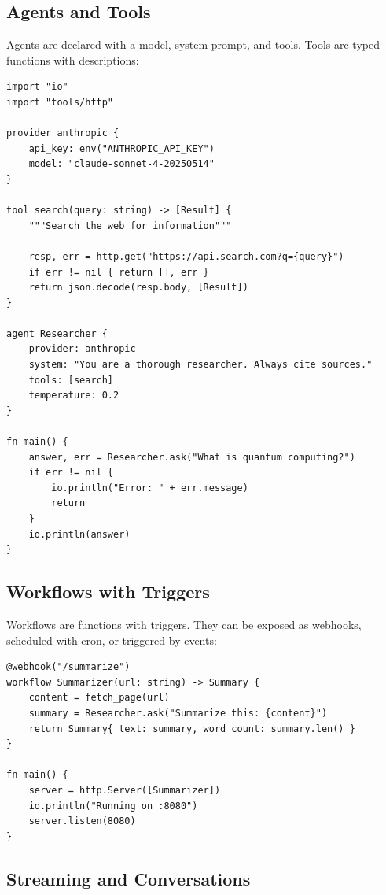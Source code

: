 \subsection{Agents and Tools}

Agents are declared with a model, system prompt, and tools. Tools are typed functions with descriptions:

\begin{lstlisting}
import "io"
import "tools/http"

provider anthropic {
    api_key: env("ANTHROPIC_API_KEY")
    model: "claude-sonnet-4-20250514"
}

tool search(query: string) -> [Result] {
    """Search the web for information"""

    resp, err = http.get("https://api.search.com?q={query}")
    if err != nil { return [], err }
    return json.decode(resp.body, [Result])
}

agent Researcher {
    provider: anthropic
    system: "You are a thorough researcher. Always cite sources."
    tools: [search]
    temperature: 0.2
}

fn main() {
    answer, err = Researcher.ask("What is quantum computing?")
    if err != nil {
        io.println("Error: " + err.message)
        return
    }
    io.println(answer)
}
\end{lstlisting}

\subsection{Workflows with Triggers}

Workflows are functions with triggers. They can be exposed as webhooks, scheduled with cron, or triggered by events:

\begin{lstlisting}
@webhook("/summarize")
workflow Summarizer(url: string) -> Summary {
    content = fetch_page(url)
    summary = Researcher.ask("Summarize this: {content}")
    return Summary{ text: summary, word_count: summary.len() }
}

fn main() {
    server = http.Server([Summarizer])
    io.println("Running on :8080")
    server.listen(8080)
}
\end{lstlisting}

\subsection{Streaming and Conversations}

